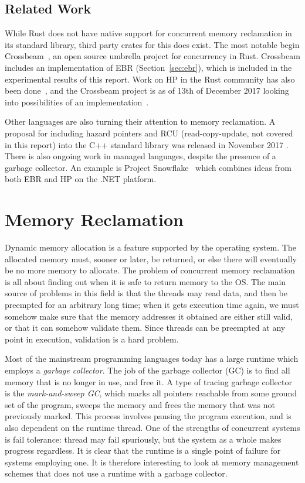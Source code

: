 \documentclass[b5paper]{report}
\begin{document}
\section{Related Work\label{sec:related-work}}

While Rust does not have native support for concurrent memory reclamation in its
standard library, third party crates for this does exist. The most notable begin
Crossbeam~\cite{crossbeam}, an open source umbrella project for concurrency in
Rust. Crossbeam includes an implementation of EBR (Section~\ref{sec:ebr}), which
is included in the experimental results of this report. Work on HP in the Rust
community has also been done~\cite{ticky:hp}, and the Crossbeam project is as of
13th of December 2017 looking into possibilities of an
implementation~\cite{crossbeam-hp}.

Other languages are also turning their attention to memory reclamation. A
proposal for including hazard pointers and RCU (read-copy-update, not covered in
this report) into the C++ standard library was released in November 2017
\cite{cpp:mr}. There is also ongoing work in managed languages, despite the
presence of a garbage collector. An example is Project
Snowflake~\cite{project-snowflake-non-blocking-safe-manual-memory-management-net}
which combines ideas from both EBR and HP on the .NET platform.



\chapter{Memory Reclamation\label{ch:memory-reclamation}}

Dynamic memory allocation is a feature supported by the operating system. The
allocated memory must, sooner or later, be returned, or else there will
eventually be no more memory to allocate. The problem of concurrent memory
reclamation is all about finding out when it is safe to return memory to the
OS\@. The main source of problems in this field is that the threads may read
data, and then be preempted for an arbitrary long time; when it gets execution
time again, we must somehow make sure that the memory addresses it obtained are
either still valid, or that it can somehow validate them. Since threads can be
preempted at any point in execution, validation is a hard problem.

Most of the mainstream programming languages today has a large runtime which
employs a \emph{garbage collector}. The job of the garbage collector (GC) is to
find all memory that is no longer in use, and free it. A type of tracing garbage
collector is the \emph{mark-and-sweep GC}, which marks all pointers reachable
from some ground set of the program, sweeps the memory and frees the memory that
was not previously marked. This process involves pausing the program execution,
and is also dependent on the runtime thread.  One of the strengths of concurrent
systems is fail tolerance: thread may fail spuriously, but the system as a whole
makes progress regardless. It is clear that the runtime is a single point of
failure for systems employing one. It is therefore interesting to look at memory
management schemes that does not use a runtime with a garbage collector.
\end{document}
